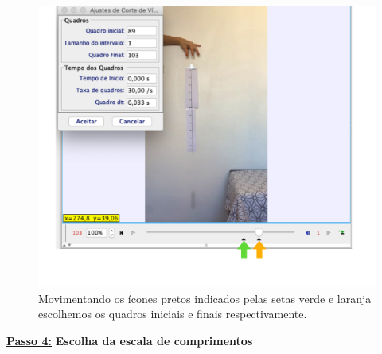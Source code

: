 \begin{minipage}{\linewidth}
\begin{minipage}{0.43\linewidth}
\begin{figure}[H]
              \includegraphics[width=\linewidth]{Figuras_exp3/fig4AppB.pdf}
\caption{\label{fig4AppB} Movimentando os ícones pretos indicados pelas setas verde e laranja escolhemos os quadros iniciais e finais respectivamente.}
          \end{figure}
      \end{minipage}
  \end{minipage}%

\underline{\bf Passo 4:} {\bf Escolha da escala de comprimentos}\\
\vskip -0.5cm

